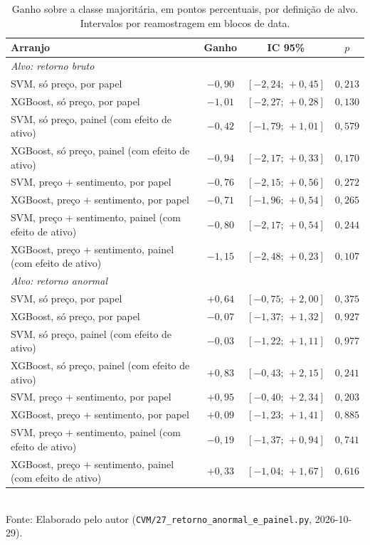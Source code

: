 \begin{table}[htpb]
\centering
\caption{Ganho sobre a classe majoritária, em pontos percentuais, por definição de alvo. Intervalos por reamostragem em blocos de data.}
\label{tab:alvo_direcao}
\begin{tabular}{l c c c}
\hline
\textbf{Arranjo} & \textbf{Ganho} & \textbf{IC 95\%} & \textbf{$p$} \\ \hline
\multicolumn{4}{l}{\textit{Alvo: retorno bruto}} \\
SVM, só preço, por papel & $-0{,}90$ & $[-2{,}24;\,+0{,}45]$ & $0{,}213$ \\
XGBoost, só preço, por papel & $-1{,}01$ & $[-2{,}27;\,+0{,}28]$ & $0{,}130$ \\
SVM, só preço, painel (com efeito de ativo) & $-0{,}42$ & $[-1{,}79;\,+1{,}01]$ & $0{,}579$ \\
XGBoost, só preço, painel (com efeito de ativo) & $-0{,}94$ & $[-2{,}17;\,+0{,}33]$ & $0{,}170$ \\
SVM, preço + sentimento, por papel & $-0{,}76$ & $[-2{,}15;\,+0{,}56]$ & $0{,}272$ \\
XGBoost, preço + sentimento, por papel & $-0{,}71$ & $[-1{,}96;\,+0{,}54]$ & $0{,}265$ \\
SVM, preço + sentimento, painel (com efeito de ativo) & $-0{,}80$ & $[-2{,}17;\,+0{,}54]$ & $0{,}244$ \\
XGBoost, preço + sentimento, painel (com efeito de ativo) & $-1{,}15$ & $[-2{,}48;\,+0{,}23]$ & $0{,}107$ \\
\hline
\multicolumn{4}{l}{\textit{Alvo: retorno anormal}} \\
SVM, só preço, por papel & $+0{,}64$ & $[-0{,}75;\,+2{,}00]$ & $0{,}375$ \\
XGBoost, só preço, por papel & $-0{,}07$ & $[-1{,}37;\,+1{,}32]$ & $0{,}927$ \\
SVM, só preço, painel (com efeito de ativo) & $-0{,}03$ & $[-1{,}22;\,+1{,}11]$ & $0{,}977$ \\
XGBoost, só preço, painel (com efeito de ativo) & $+0{,}83$ & $[-0{,}43;\,+2{,}15]$ & $0{,}241$ \\
SVM, preço + sentimento, por papel & $+0{,}95$ & $[-0{,}40;\,+2{,}34]$ & $0{,}203$ \\
XGBoost, preço + sentimento, por papel & $+0{,}09$ & $[-1{,}23;\,+1{,}41]$ & $0{,}885$ \\
SVM, preço + sentimento, painel (com efeito de ativo) & $-0{,}19$ & $[-1{,}37;\,+0{,}94]$ & $0{,}741$ \\
XGBoost, preço + sentimento, painel (com efeito de ativo) & $+0{,}33$ & $[-1{,}04;\,+1{,}67]$ & $0{,}616$ \\
\hline
\end{tabular}
\vspace{0.2cm}
{\small \\ Fonte: Elaborado pelo autor (\texttt{CVM/27\_retorno\_anormal\_e\_painel.py}, 2026-10-29).}
\end{table}

